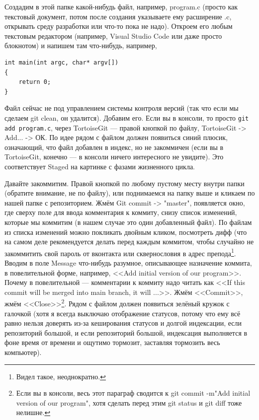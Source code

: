 \documentclass{../text-style}
\begin{document}
Создадим в этой папке какой-нибудь файл, например, program.c (просто как текстовый документ, потом после создания указываете ему расширение .c, открывать среду разработки или что-то пока не надо). Откроем его любым текстовым редактором (например, Visual Studio Code или даже просто блокнотом) и напишем там что-нибудь, например,

\begin{verbatim}
int main(int argc, char* argv[])
{
    return 0;
}
\end{verbatim}

Файл сейчас не под управлением системы контроля версий (так что если мы сделаем git clean, он удалится). Добавим его. Если вы в консоли, то просто \verb|git add program.c|, через TortoiseGit --- правой кнопкой по файлу, TortoiseGit -> Add... -> ОК. По идее рядом с файлом должен появиться синий плюсик, означающий, что файл добавлен в индекс, но не закоммичен (если вы в TortoiseGit, конечно --- в консоли ничего интересного не увидите). Это соответствует Staged на картинке с фазами жизненного цикла.

Давайте закоммитим. Правой кнопкой по любому пустому месту внутри папки (обратите внимание, не по файлу), или поднимаемся на папку выше и кликаем по нашей папке с репозиторием. Жмём Git commit -> "master", появляется окно, где сверху поле для ввода комментария к коммиту, снизу список изменений, которые мы коммитим (в нашем случае это один добавленный файл). По файлам из списка изменений можно покликать двойным кликом, посмотреть дифф (что на самом деле рекомендуется делать перед каждым коммитом, чтобы случайно не закоммитить свой пароль от вконтакта или сквернословия в адрес препода\footnote{Видел такое, неоднократно.}. Вводим в поле Message что-нибудь разумное, описывающее назначение коммита, в повелительной форме, например, <<Add initial version of our program>>. Почему в повелительной --- комментарии к коммиту надо читать как <<If this commit will be merged into main branch, it will ...>>. Жмём <<Commit>>, жмём <<Close>>\footnote{Если вы в консоли, весь этот параграф сводится к git commit -m"Add initial version of our program", хотя сделать перед этим git status и git diff тоже нелишне.}. Рядом с файлом должен появиться зелёный кружок с галочкой (хотя я всегда выключаю отображение статусов, потому что ему всё равно нельзя доверять из-за кеширования статусов и долгой индексации, если репозиторий большой, и если репозиторий большой, индексация выполняется в фоне время от времени и ощутимо тормозит, заставляя тормозить весь компьютер).
\end{document}
